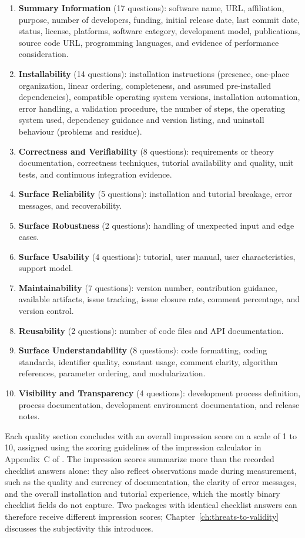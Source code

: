 \begin{enumerate}
    \item \textbf{Summary Information} (17 questions): software name, URL, affiliation, purpose, number of developers, funding, initial release date, last commit date, status, license, platforms, software category, development model, publications, source code URL, programming languages, and evidence of performance consideration.
    \item \textbf{Installability} (14 questions): installation instructions (presence, one-place organization, linear ordering, completeness, and assumed pre-installed dependencies), compatible operating system versions, installation automation, error handling, a validation procedure, the number of steps, the operating system used, dependency guidance and version listing, and uninstall behaviour (problems and residue).
    \item \textbf{Correctness and Verifiability} (8 questions): requirements or theory documentation, correctness techniques, tutorial availability and quality, unit tests, and continuous integration evidence.
    \item \textbf{Surface Reliability} (5 questions): installation and tutorial breakage, error messages, and recoverability.
    \item \textbf{Surface Robustness} (2 questions): handling of unexpected input and edge cases.
    \item \textbf{Surface Usability} (4 questions): tutorial, user manual, user characteristics, support model.
    \item \textbf{Maintainability} (7 questions): version number, contribution guidance, available artifacts, issue tracking, issue closure rate, comment percentage, and version control.
    \item \textbf{Reusability} (2 questions): number of code files and API documentation.
    \item \textbf{Surface Understandability} (8 questions): code formatting, coding standards, identifier quality, constant usage, comment clarity, algorithm references, parameter ordering, and modularization.
    \item \textbf{Visibility and Transparency} (4 questions): development process definition, process documentation, development environment documentation, and release notes.
\end{enumerate}

Each quality section concludes with an overall impression score on a scale of 1 to 10, assigned using the scoring guidelines of the impression calculator in Appendix~C of \citet{Smith2021}. The impression scores summarize more than the recorded checklist answers alone: they also reflect observations made during measurement, such as the quality and currency of documentation, the clarity of error messages, and the overall installation and tutorial experience, which the mostly binary checklist fields do not capture. Two packages with identical checklist answers can therefore receive different impression scores; Chapter~\ref{ch:threats-to-validity} discusses the subjectivity this introduces.

